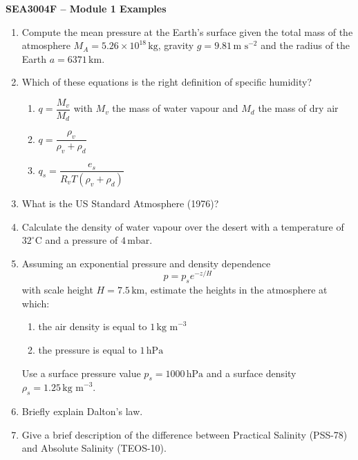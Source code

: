 \documentclass[12pt]{article}
\begin{document}
\begin{center}
\Large \textbf{SEA3004F -- Module 1 Examples}
\end{center}

\vspace{0.5cm}
\begin{enumerate}

\item Compute the mean pressure at the Earth’s surface given the total mass of the atmosphere 
$M_A = 5.26 \times 10^{18}\,\text{kg}$, gravity $g = 9.81\,\text{m s}^{-2}$ and the radius of the Earth 
$a = 6371\,\text{km}$.

\item Which of these equations is the right definition of specific humidity?

\begin{enumerate}[label=\alph*)]
\item $q = \dfrac{M_v}{M_d}$ with $M_v$ the mass of water vapour and $M_d$ the mass of dry air 
\item $q = \dfrac{\rho_v}{\rho_v + \rho_d}$
\item $q_s = \dfrac{e_s}{R_v T (\rho_v + \rho_d)}$ 
\end{enumerate}

\item What is the US Standard Atmosphere (1976)?

\item Calculate the density of water vapour over the desert with a temperature of $32^\circ\text{C}$ and a pressure of $4\,\text{mbar}$.

\item Assuming an exponential pressure and density dependence
\[
p = p_s e^{-z/H}
\]
with scale height $H = 7.5\,\text{km}$, estimate the heights in the atmosphere at which:

\begin{enumerate}[label=\alph*)]
\item the air density is equal to $1\,\text{kg m}^{-3}$
\item the pressure is equal to $1\,\text{hPa}$
\end{enumerate}

Use a surface pressure value $p_s = 1000\,\text{hPa}$ and a surface density $\rho_s = 1.25\,\text{kg m}^{-3}$.

\item Briefly explain Dalton’s law.

\item Give a brief description of the difference between Practical Salinity (PSS-78) and Absolute Salinity (TEOS-10).


\end{enumerate}
\end{document}

